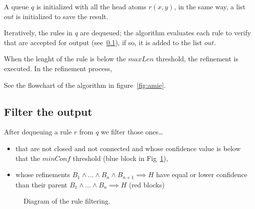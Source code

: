 \documentclass{article}
\begin{document}
A queue $q$ is initialized with all the head atoms $r(x,y)$, in the same way, a
list $out$ is initialized to save the result. 

Iteratively, the rules in $q$ are dequeued; the algorithm evaluates each rule
to verify that are accepted for output (see~\ref{ssec:filter_output}), if so, it
is added to the list $out$.

When the lenght of the rule is below the $maxLen$ threshold, the refinement
is executed. In the refinement process, 

See the flowchart of the algorithm in figure~\ref{fig:amie}. 


\subsection{Filter the output}
\label{ssec:filter_output}

After dequeuing a rule $r$ from $q$ we filter those ones\ldots

\begin{itemize}
    \item that are not closed and not connected and whose confidence value is
        below that the $minConf$ threshold (blue block in Fig~\ref{fig:accepted_for_output}),
    \item whose refinements $B_1 \land \ldots \land B_n \land B_{n+1} \implies H$
        have equal or lower confidence than their parent
        $B_1 \land \ldots \land B_n \implies H$ (red blocks)
\end{itemize}

\begin{figure}[H]
\centering
\resizebox{!}{0.50\textheight}{%
    
}
\caption{Diagram of the rule filtering.}
\label{fig:accepted_for_output}
\end{figure}
\end{document}
